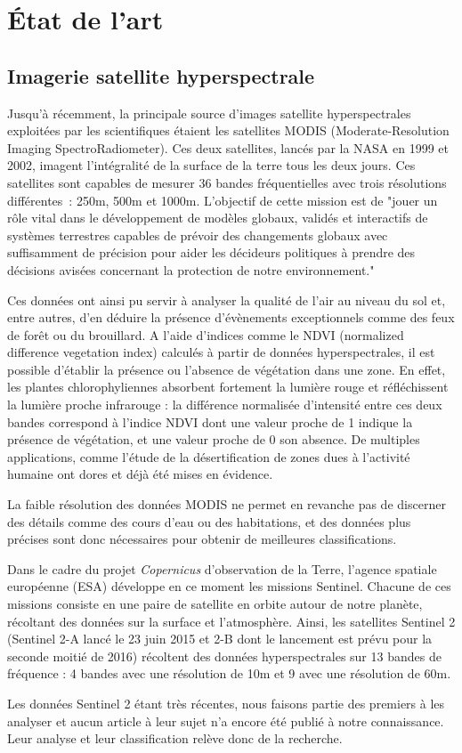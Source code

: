 
\section{État de l'art}
\subsection{Imagerie satellite hyperspectrale}

Jusqu'à récemment, la principale source d'images satellite hyperspectrales exploitées par les scientifiques étaient les satellites MODIS (Moderate-Resolution Imaging SpectroRadiometer). Ces deux satellites, lancés par la NASA en 1999 et 2002, imagent l'intégralité de la surface de la terre tous les deux jours. Ces satellites sont capables de mesurer 36 bandes fréquentielles avec trois résolutions différentes : 250m, 500m et 1000m\cite{nasa}. L'objectif de cette mission est de "jouer un rôle vital dans le développement de modèles globaux, validés et interactifs de systèmes terrestres capables de prévoir des changements globaux avec suffisamment de précision pour aider les décideurs politiques à prendre des décisions avisées concernant la protection de notre environnement."

Ces données ont ainsi pu servir à analyser la qualité de l'air au niveau du sol et, entre autres, d'en déduire la présence d'évènements exceptionnels comme des feux de forêt ou du brouillard\cite{airSurv}. A l'aide d'indices comme le NDVI (normalized difference vegetation index) calculés à partir de données hyperspectrales, il est possible d'établir la présence ou l'absence de végétation dans une zone. En effet, les plantes chlorophyliennes absorbent fortement la lumière rouge et réfléchissent la lumière proche infrarouge : la différence normalisée d'intensité entre ces deux bandes correspond à l'indice NDVI dont une valeur proche de 1 indique la présence de végétation, et une valeur proche de 0 son absence. De multiples applications, comme l'étude de la désertification de zones dues à l'activité humaine\cite{desert} ont dores et déjà été mises en évidence.

La faible résolution des données MODIS ne permet en revanche pas de discerner des détails comme des cours d'eau ou des habitations, et des données plus précises sont donc nécessaires pour obtenir de meilleures classifications. 

Dans le cadre du projet \textit{Copernicus} d'observation de la Terre, l'agence spatiale européenne (ESA) développe en ce moment les missions Sentinel. Chacune de ces missions consiste en une paire de satellite en orbite autour de notre planète, récoltant des données sur la surface et l'atmosphère. Ainsi, les satellites Sentinel 2 (Sentinel 2-A lancé le 23 juin 2015 et 2-B dont le lancement est prévu pour la seconde moitié de 2016)\cite{sent2} récoltent des données hyperspectrales sur 13 bandes de fréquence : 4 bandes avec une résolution de 10m et 9 avec une résolution de 60m.

Les données Sentinel 2 étant très récentes, nous faisons partie des premiers à les analyser et aucun article à leur sujet n'a encore été publié à notre connaissance. Leur analyse et leur classification relève donc de la recherche.
